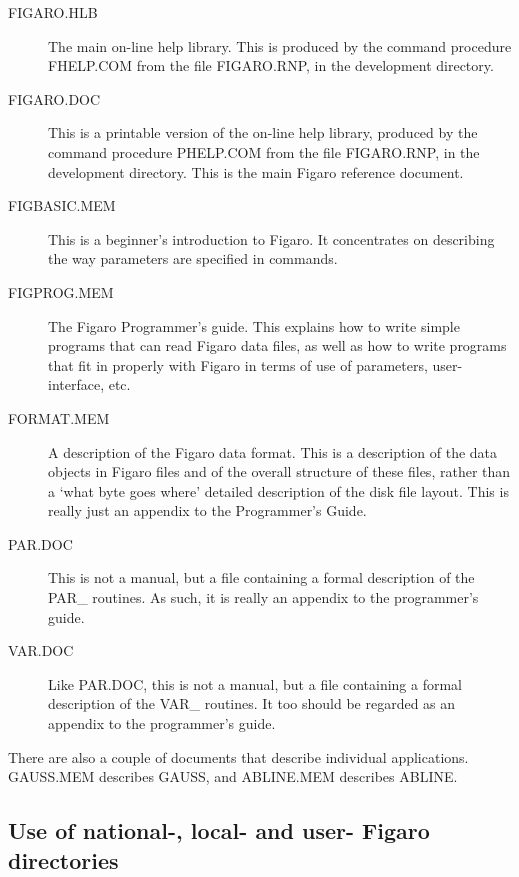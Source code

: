 \begin{description}
\item [FIGARO.HLB] The main on-line help library. This is produced by the
command procedure FHELP.COM from the file FIGARO.RNP, in the development
directory.

\item [FIGARO.DOC] This is a printable version of the on-line help 
library, produced by the command procedure PHELP.COM from the file 
FIGARO.RNP, in the development directory.  This is the main Figaro
reference document.

\item [FIGBASIC.MEM] This is a beginner's introduction to Figaro.  It 
concentrates on describing the way parameters are specified in commands.

\item [FIGPROG.MEM] The Figaro Programmer's guide.  This explains how to 
write simple programs that can read Figaro data files, as well as how to 
write programs that fit in properly with Figaro in terms of use of parameters,
user-interface, etc.

\item [FORMAT.MEM] A description of the Figaro data format. This is a
description of the data objects in Figaro files and of the overall structure 
of these files, rather than a `what byte goes where' detailed description of 
the disk file layout. This  is  really  just  an  appendix to the
Programmer's Guide.

\item [PAR.DOC] This is not a manual, but  a  file containing  a 
formal description of the PAR\_ routines. As such, it is really an 
appendix to the programmer's guide.

\item [VAR.DOC] Like PAR.DOC, this is not a manual, but a file containing a
formal description of the VAR\_ routines.  It too should be regarded as 
an appendix to the programmer's guide.

\end{description}
      
There are also a couple of documents that describe individual applications. 
GAUSS.MEM describes GAUSS, and ABLINE.MEM describes ABLINE. 

\subsection{Use of national-, local- and user- Figaro directories}

